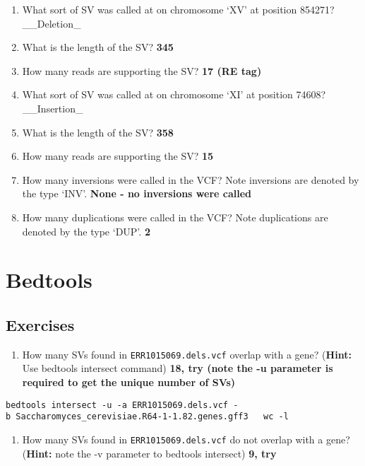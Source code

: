 \documentclass[11pt]{article}
\providecommand{\tightlist}{%
      \setlength{\itemsep}{0pt}\setlength{\parskip}{0pt}}
\begin{document}
\begin{enumerate}
\def\labelenumi{\arabic{enumi}.}
\item
  What sort of SV was called at on chromosome `XV' at position 854271?
  \_\_Deletion\_
\item
  What is the length of the SV? \textbf{345}
\item
  How many reads are supporting the SV? \textbf{17 (RE tag)}
\item
  What sort of SV was called at on chromosome `XI' at position 74608?
  \_\_Insertion\_
\item
  What is the length of the SV? \textbf{358}
\item
  How many reads are supporting the SV? \textbf{15}
\item
  How many inversions were called in the VCF? Note inversions are
  denoted by the type `INV'. \textbf{None - no inversions were called}
\item
  How many duplications were called in the VCF? Note duplications are
  denoted by the type `DUP'. \textbf{2}
\end{enumerate}

    \hypertarget{bedtools}{%
\section{Bedtools}\label{bedtools}}

\hypertarget{exercises}{%
\subsection{Exercises}\label{exercises}}

\begin{enumerate}
\def\labelenumi{\arabic{enumi}.}
\tightlist
\item
  How many SVs found in \texttt{ERR1015069.dels.vcf} overlap with a
  gene? (\textbf{Hint:} Use bedtools intersect command) \textbf{18, try
  (note the -u parameter is required to get the unique number of SVs)}
\end{enumerate}

\texttt{bedtools\ intersect\ -u\ -a\ ERR1015069.dels.vcf\ -b\ Saccharomyces\_cerevisiae.R64-1-1.82.genes.gff3\ ~\textbar{}\ wc\ -l}

\begin{enumerate}
\def\labelenumi{\arabic{enumi}.}
\setcounter{enumi}{1}
\tightlist
\item
  How many SVs found in \texttt{ERR1015069.dels.vcf} do not overlap with
  a gene? (\textbf{Hint:} note the -v parameter to bedtools intersect)
  \textbf{9, try}
\end{enumerate}
\end{document}
